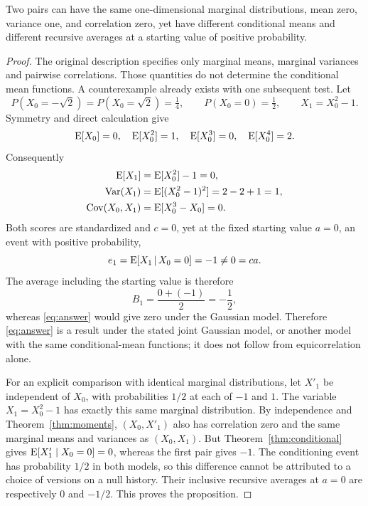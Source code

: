 \begin{proposition}
\label{prop:counterexample}
Two pairs can have the same one-dimensional marginal distributions, mean
zero, variance one, and correlation zero, yet have different conditional
means and different recursive averages at a starting value of positive
probability.
\end{proposition}
\begin{proof}

The original description specifies only marginal means, marginal variances
and pairwise correlations. Those quantities do not determine the conditional
mean functions. A counterexample already exists with one subsequent test.
Let
\[
  P(X_0=-\sqrt2)=P(X_0=\sqrt2)=\tfrac14,
  \qquad P(X_0=0)=\tfrac12,
  \qquad X_1=X_0^2-1.
\]
Symmetry and direct calculation give
\[
  \operatorname{E}[X_0]=0,\quad \operatorname{E}[X_0^2]=1,\quad
  \operatorname{E}[X_0^3]=0,\quad \operatorname{E}[X_0^4]=2.
\]
Consequently
\begin{align*}
  \operatorname{E}[X_1]&=\operatorname{E}[X_0^2]-1=0,\\
  \operatorname{Var}(X_1)&=\operatorname{E}[(X_0^2-1)^2]=2-2+1=1,\\
  \operatorname{Cov}(X_0,X_1)&=\operatorname{E}[X_0^3-X_0]=0.
\end{align*}
Both scores are standardized and \(c=0\), yet at the fixed starting value
\(a=0\), an event with positive probability,
\[
  e_1=\operatorname{E}[X_1\,\vert\, X_0=0]=-1\ne0=ca.
\]
The average including the starting value is therefore
\[
  B_1=\frac{0+(-1)}2=-\frac12,
\]
whereas \eqref{eq:answer} would give zero under the Gaussian model.
Therefore \eqref{eq:answer} is a result under the stated joint Gaussian
model, or another model with the same conditional-mean functions; it does
not follow from equicorrelation alone.

For an explicit comparison with identical marginal distributions, let
\(X'_1\) be independent of \(X_0\), with probabilities \(1/2\) at each of
\(-1\) and \(1\). The variable \(X_1=X_0^2-1\) has exactly this same
marginal distribution. By independence and Theorem~\ref{thm:moments},
\((X_0,X'_1)\) also has correlation zero and the same marginal means and
variances as \((X_0,X_1)\). But Theorem~\ref{thm:conditional} gives
\(\operatorname{E}[X'_1\mid X_0=0]=0\), whereas the first pair gives \(-1\).
The conditioning event has probability \(1/2\) in both models, so this
difference cannot be attributed to a choice of versions on a null history.
Their inclusive recursive averages at \(a=0\) are respectively \(0\)
and \(-1/2\). This proves the proposition.
\end{proof}

